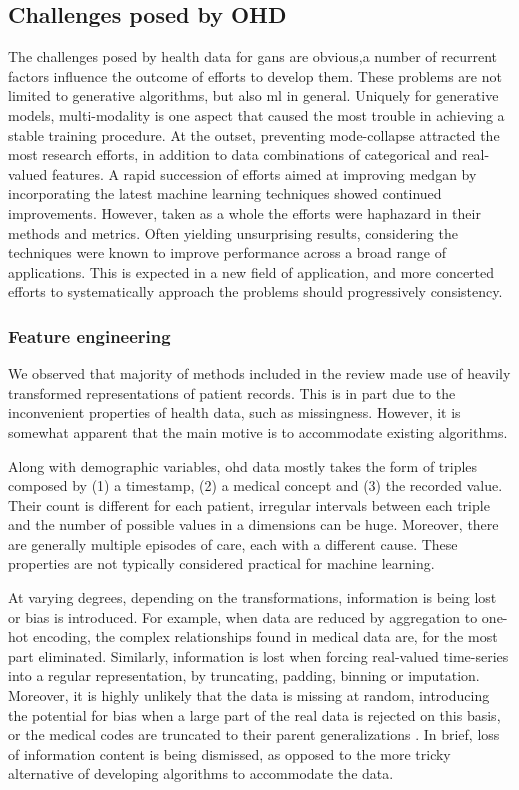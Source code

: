 \subsection{Challenges posed by OHD}

The challenges posed by health data for \glspl{gan} are obvious,a number of recurrent factors influence the outcome of efforts to develop them. These problems are not limited to generative algorithms, but also \gls{ml} in general. Uniquely for generative models, multi-modality is one aspect that caused the most trouble in achieving a stable training procedure. At the outset, preventing \gls{mode-collapse} attracted the most research efforts, in addition to data combinations of categorical and real-valued features. A rapid succession of efforts aimed at improving \gls{medgan} by incorporating the latest machine learning techniques showed continued improvements. However, taken as a whole the efforts were haphazard in their methods and metrics. Often yielding unsurprising results, considering the techniques were known to improve performance across a broad range of applications. This is expected in a new field of application, and more concerted efforts to systematically approach the problems should progressively consistency.\par

\subsubsection{Feature engineering}
We observed that majority of methods included in the review made use of heavily transformed representations of patient records. This is in part due to the inconvenient properties of health data, such as missingness. However, it is somewhat apparent that the main motive is to accommodate existing algorithms.\par
Along with demographic variables, \gls{ohd} data mostly takes the form of triples composed by (1) a timestamp, (2) a medical concept and (3) the recorded value. Their count is different for each patient, irregular intervals between each triple and the number of possible values in a dimensions can be huge. Moreover, there are generally multiple episodes of care, each with a different cause. These properties are not typically considered practical for machine learning. \par
At varying degrees, depending on the transformations, information is being lost or bias is introduced. For example, when data are reduced by aggregation to one-hot encoding, the complex relationships found in medical data are, for the most part eliminated. Similarly, information is lost when forcing real-valued time-series into a regular representation, by truncating, padding, binning or imputation. Moreover, it is highly unlikely that the data is missing at random, introducing the potential for bias when a large part of the real data is rejected on this basis, or the medical codes are truncated to their parent generalizations \cite{Zhang2020, Choi2017-nt}. In brief, loss of information content is being dismissed, as opposed to the more tricky alternative of developing algorithms to accommodate the data.\par

